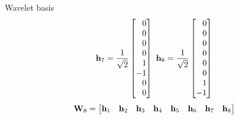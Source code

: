 \documentclass[aspectratio=169]{beamer}
\def\mf{\ensuremath\mathbf}
\def\bmx{\ensuremath\begin{bmatrix*}[r]}
\def\emx{\ensuremath\end{bmatrix*}}
\begin{document}
\begin{frame}[t]{Wavelet basis}
\[  \mf{h}_7 = \frac{1}{\sqrt{2}}\bmx 0 \\ 0 \\ 0 \\ 0 \\ 1 \\ -1 \\ 0 \\ 0 \emx \,\, 
  \mf{h}_8 = \frac{1}{\sqrt{2}}\bmx 0 \\ 0 \\ 0 \\ 0 \\ 0 \\ 0 \\ 1 \\ -1 \emx 
  \]
  \[ \mf{W}_8 = \bmx \mf{h}_1 & \mf{h}_2 & \mf{h}_3 & \mf{h}_4 & \mf{h}_5 & \mf{h}_6 & \mf{h}_7 & \mf{h}_8 \emx\]
\end{frame}
\end{document}
